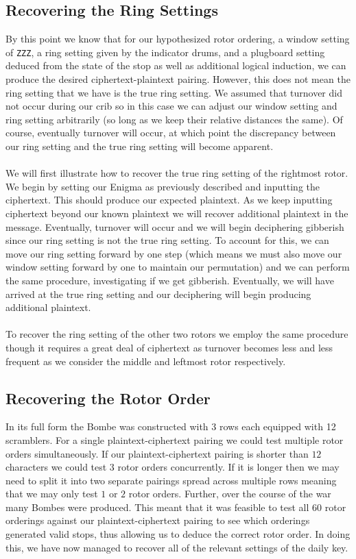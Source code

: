 \subsection{Recovering the Ring Settings}\label{bombe_ring_setting}
By this point we know that for our hypothesized rotor ordering, a
window setting of \texttt{ZZZ}, a ring setting given by the indicator
drums, and a plugboard setting deduced from the state of the stop as
well as additional logical induction, we can produce the desired
ciphertext-plaintext pairing. However, this does not mean the ring
setting that we have is the true ring setting. We assumed that
turnover did not occur during our crib so in this case we can adjust
our window setting and ring setting arbitrarily (so long as we keep
their relative distances the same). Of course, eventually turnover
will occur, at which point the discrepancy between our ring setting
and the true ring setting will become apparent.
\\\\We will first illustrate how to recover the true ring setting of
the rightmost rotor. We begin by setting our Enigma as previously
described and inputting the ciphertext. This should produce our
expected plaintext. As we keep inputting ciphertext beyond our known
plaintext we will recover additional plaintext in the message.
Eventually, turnover will occur and we will begin deciphering
gibberish since our ring setting is not the true ring setting. To
account for this, we can move our ring setting forward by one step
(which means we must also move our window setting forward by one to
maintain our permutation) and we can perform the same procedure,
investigating if we get gibberish. Eventually, we will have arrived
at the true ring setting and our deciphering will begin producing
additional plaintext.
\\\\To recover the ring setting of the other two rotors we employ the
same procedure though it requires a great deal of ciphertext as
turnover becomes less and less frequent as we consider the middle and
leftmost rotor respectively.

\subsection{Recovering the Rotor Order}
In its full form the Bombe was constructed with $3$ rows each
equipped with 12 scramblers. For a single plaintext-ciphertext
pairing we could test multiple rotor orders simultaneously. If our
plaintext-ciphertext pairing is shorter than $12$ characters we could
test $3$ rotor orders concurrently. If it is longer then we may need
to split it into two separate pairings spread across multiple rows
meaning that we may only test $1$ or $2$ rotor orders. Further, over
the course of the war many Bombes were produced. This meant that it
was feasible to test all $60$ rotor orderings against our
plaintext-ciphertext pairing to see which orderings generated valid
stops, thus allowing us to deduce the correct rotor order. In doing
this, we have now managed to recover all of the relevant settings of
the daily key.

